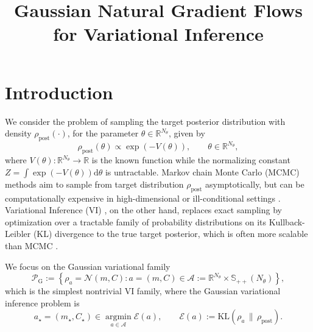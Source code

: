 \documentclass[11pt]{article}
\title{Gaussian Natural Gradient Flows for Variational Inference}
\theoremstyle{plain}
\theoremstyle{definition}
\theoremstyle{remark}
\newcommand{\R}{\mathbb{R}}
\newcommand{\N}{\mathcal{N}}
\newcommand{\KL}{\mathrm{KL}}
\newcommand{\SPD}{\mathbb{S}_{++}}
\newcommand{\post}{\mathrm{post}}
\newcommand{\dd}{\mathrm{d}}
\newcommand{\PG}{\mathcal{P}_{\mathrm{G}}}
\newcommand{\Aspace}{\mathcal{A}}
\begin{document}
\maketitle

\section{Introduction}
We consider the problem of sampling the target posterior distribution with density $\rho_\post (\cdot)$, for the parameter $\theta \in \R^{N_\theta}$, given by 
\begin{equation*}
    \rho_\post (\theta) \propto \exp (-V(\theta)), \qquad \theta \in \R^{N_\theta},
\end{equation*}
where $V(\theta) : \R^{N_\theta} \to \R$ is the known function while the normalizing constant $Z = \int \exp (-V(\theta))  \dd \theta$ is untractable. Markov chain Monte Carlo (MCMC) methods \cite{brooks2011handbook} aim to sample from target distribution $\rho_\post$ asymptotically, but can be computationally expensive in high-dimensional or ill-conditional settings \cite{JMLR:v23:20-357}. Variational Inference (VI) \cite{blei2017variational}, on the other hand, replaces exact sampling by optimization over a tractable family of probability distributions on its Kullback-Leibler (KL) divergence to the true target posterior, which is often more scalable than MCMC \cite{JMLR:v14:hoffman13a}. 

We focus on the Gaussian variational family
\begin{equation*}
    \PG := \left\{ \rho_a = \N(m,C) : a=(m,C)\in \Aspace := \R^{N_\theta} \times \SPD(N_\theta) \right\},
\end{equation*}
which is the simplest nontrivial VI family, where the Gaussian variational inference problem is 
\begin{equation*}
    a_\star = (m_\star,C_\star) \in \operatorname*{argmin}_{a\in\Aspace} \mathcal{E}(a), \qquad \mathcal{E}(a) := \KL(\rho_a\,\|\,\rho_{\post}).
\end{equation*}
\end{document}
